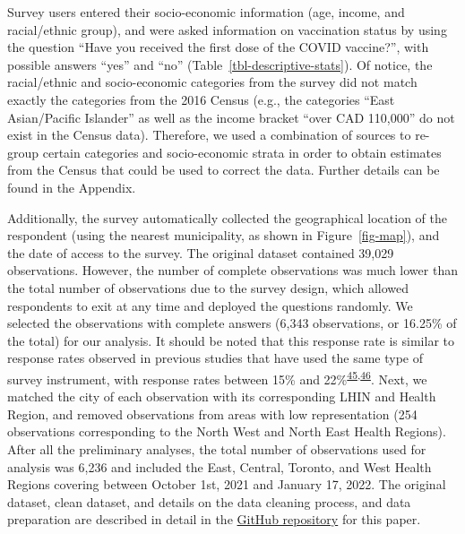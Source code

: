 \documentclass[
]{article}
\begin{document}
Survey users entered their socio-economic information (age, income, and
racial/ethnic group), and were asked information on vaccination status
by using the question ``Have you received the first dose of the COVID
vaccine?'', with possible answers ``yes'' and ``no''
(Table~\ref{tbl-descriptive-stats}). Of notice, the racial/ethnic and
socio-economic categories from the survey did not match exactly the
categories from the 2016 Census (e.g., the categories ``East
Asian/Pacific Islander'' as well as the income bracket ``over CAD
110,000'' do not exist in the Census data). Therefore, we used a
combination of sources to re-group certain categories and socio-economic
strata in order to obtain estimates from the Census that could be used
to correct the data. Further details can be found in the Appendix.

Additionally, the survey automatically collected the geographical
location of the respondent (using the nearest municipality, as shown in
Figure~\ref{fig-map}), and the date of access to the survey. The
original dataset contained 39,029 observations. However, the number of
complete observations was much lower than the total number of
observations due to the survey design, which allowed respondents to exit
at any time and deployed the questions randomly. We selected the
observations with complete answers (6,343 observations, or 16.25\% of
the total) for our analysis. It should be noted that this response rate
is similar to response rates observed in previous studies that have used
the same type of survey instrument, with response rates between 15\% and
22\%\textsuperscript{\protect\hyperlink{ref-kim2021}{45},\protect\hyperlink{ref-seeman2010}{46}}.
Next, we matched the city of each observation with its corresponding
LHIN and Health Region, and removed observations from areas with low
representation (254 observations corresponding to the North West and
North East Health Regions). After all the preliminary analyses, the
total number of observations used for analysis was 6,236 and included
the East, Central, Toronto, and West Health Regions covering between
October 1st, 2021 and January 17, 2022. The original dataset, clean
dataset, and details on the data cleaning process, and data preparation
are described in detail in the
\href{https://github.com/aimundo/COVID-19_vaccination/}{GitHub
repository} for this paper.
\end{document}
